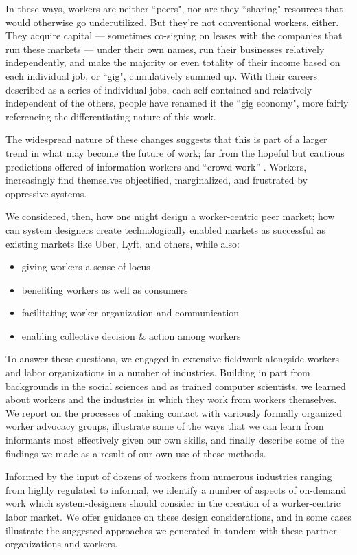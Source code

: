 In these ways, workers are neither ``peers", nor are they ``sharing" resources that would otherwise go underutilized.
But they're not conventional workers, either.
They acquire capital
--- sometimes co-signing on leases with the companies that run these markets ---
under their own names, run their businesses relatively independently, and make the majority or even totality of their income based on each individual job, or ``gig", cumulatively summed up.
With their careers described as a series of individual jobs, each self-contained and relatively independent of the others, people have renamed it the ``gig economy", more fairly referencing the differentiating nature of this work.

The widespread nature of these changes suggests that this is part of a larger trend in what may become the future of work;
far from the hopeful but cautious predictions offered of information workers and ``crowd work'' \cite{crowdworkFuture}.
Workers, increasingly find themselves objectified, marginalized, and frustrated by oppressive systems.

We considered, then, how one might design a worker-centric peer market;
how can system designers create technologically enabled markets as successful as existing markets like Uber, Lyft, and others, while also:
\begin{itemize} \itemsep0pt \parskip0pt
  \item giving workers a sense of locus
  \item benefiting workers as well as consumers
  \item facilitating worker organization and communication
  \item enabling collective decision \& action among workers
\end{itemize}

To answer these questions, we engaged in extensive fieldwork alongside workers and labor organizations in a number of industries.
Building in part from backgrounds in the social sciences and as trained computer scientists,
we learned about workers and the industries in which they work from workers themselves.
We report on the processes of making contact with variously formally organized worker advocacy groups,
illustrate some of the ways that we can learn from informants most effectively given our own skills,
and finally describe some of the findings we made as a result of our own use of these methods.

Informed by the input of dozens of workers from numerous industries ranging from highly regulated to informal,
we identify a number of aspects of on-demand work which system-designers should consider in the creation of a worker-centric labor market.
We offer guidance on these design considerations,
and in some cases illustrate the suggested approaches we generated in tandem with these partner organizations and workers.

